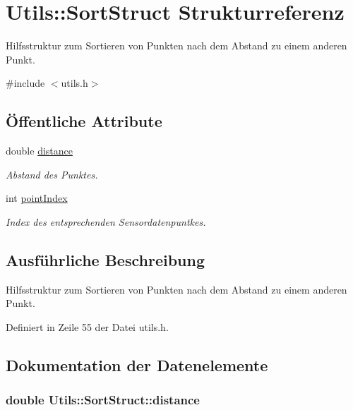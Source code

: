 \hypertarget{structUtils_1_1SortStruct}{\section{Utils\-:\-:Sort\-Struct Strukturreferenz}
\label{structUtils_1_1SortStruct}
}


Hilfsstruktur zum Sortieren von Punkten nach dem Abstand zu einem anderen Punkt.  




{\ttfamily \#include $<$utils.\-h$>$}

\subsection*{Öffentliche Attribute}
\begin{DoxyCompactItemize}
\item 
double \hyperlink{structUtils_1_1SortStruct_aca911abd52b034a588bab7b414cf93cb}{distance}
\begin{DoxyCompactList}\small\item\em Abstand des Punktes. \end{DoxyCompactList}\item 
int \hyperlink{structUtils_1_1SortStruct_ad470a3f9a230e66a47fd022bf7a4a70e}{point\-Index}
\begin{DoxyCompactList}\small\item\em Index des entsprechenden Sensordatenpuntkes. \end{DoxyCompactList}\end{DoxyCompactItemize}


\subsection{Ausführliche Beschreibung}
Hilfsstruktur zum Sortieren von Punkten nach dem Abstand zu einem anderen Punkt. 

Definiert in Zeile 55 der Datei utils.\-h.



\subsection{Dokumentation der Datenelemente}
\hypertarget{structUtils_1_1SortStruct_aca911abd52b034a588bab7b414cf93cb}{
\subsubsection[{distance}]{\setlength{\rightskip}{0pt plus 5cm}double Utils\-::\-Sort\-Struct\-::distance}}\label{structUtils_1_1SortStruct_aca911abd52b034a588bab7b414cf93cb}


